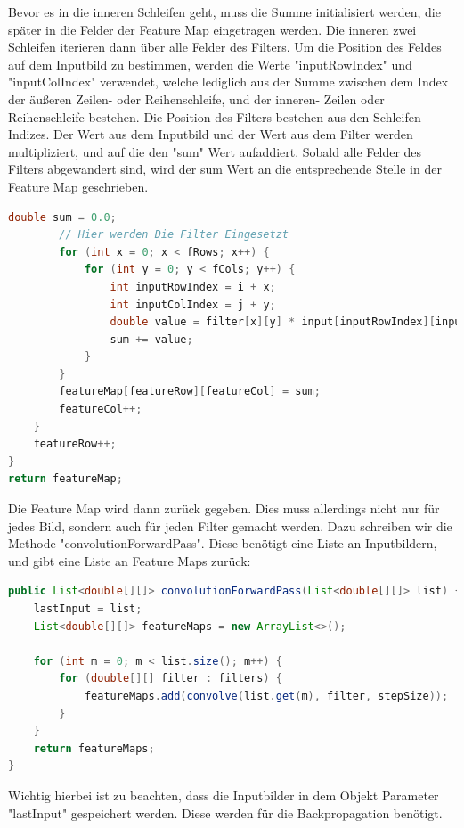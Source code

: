 \documentclass[12pt]{article}
\begin{document}
Bevor es in die inneren Schleifen geht, muss die Summe initialisiert werden, die später in die Felder der Feature Map eingetragen werden. Die inneren zwei Schleifen iterieren dann über alle Felder des Filters. Um die Position des Feldes auf dem Inputbild zu bestimmen, werden die Werte "inputRowIndex" und "inputColIndex" verwendet, welche lediglich aus der Summe zwischen dem Index der äußeren Zeilen- oder Reihenschleife, und der inneren- Zeilen oder Reihenschleife bestehen. Die Position des Filters bestehen aus den Schleifen Indizes. Der Wert aus dem Inputbild und der Wert aus dem Filter werden multipliziert, und auf die den "sum" Wert aufaddiert. Sobald alle Felder des Filters abgewandert sind, wird der sum Wert an die entsprechende Stelle in der Feature Map geschrieben.

\begin{lstlisting}[language=Java]
        double sum = 0.0;
        // Hier werden Die Filter Eingesetzt
        for (int x = 0; x < fRows; x++) {
            for (int y = 0; y < fCols; y++) {
                int inputRowIndex = i + x;
                int inputColIndex = j + y;
                double value = filter[x][y] * input[inputRowIndex][inputColIndex];
                sum += value;
            }
        }
        featureMap[featureRow][featureCol] = sum;
        featureCol++;
    }
    featureRow++;
}
return featureMap;  
\end{lstlisting}

Die Feature Map wird dann zurück gegeben. Dies muss allerdings nicht nur für jedes Bild, sondern auch für jeden Filter gemacht werden. Dazu schreiben wir die Methode "convolutionForwardPass". Diese benötigt eine Liste an Inputbildern, und gibt eine Liste an Feature Maps zurück:

\begin{lstlisting}[language=Java]
public List<double[][]> convolutionForwardPass(List<double[][]> list) {
    lastInput = list;
    List<double[][]> featureMaps = new ArrayList<>();

    for (int m = 0; m < list.size(); m++) {
        for (double[][] filter : filters) {
            featureMaps.add(convolve(list.get(m), filter, stepSize));
        }
    }
    return featureMaps;
}
\end{lstlisting}

Wichtig hierbei ist zu beachten, dass die Inputbilder in dem Objekt Parameter "lastInput" gespeichert werden. Diese werden für die Backpropagation benötigt.
\end{document}
